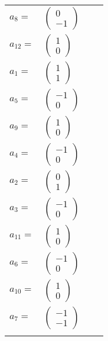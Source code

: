 \documentclass[1p]{elsarticle_modified}
\theoremstyle{definition}
\begin{document}
\begin{tabular}{m{7pt} m{180pt} m{7pt} m{180pt} }
\flushright $a_{8}=$&$\begin{pmatrix}0\\-1\end{pmatrix}$ \\
\flushright $a_{12}=$&$\begin{pmatrix}1\\0\end{pmatrix}$ \\
\flushright $a_{1}=$&$\begin{pmatrix}1\\1\end{pmatrix}$ \\
\flushright $a_{5}=$&$\begin{pmatrix}-1\\0\end{pmatrix}$ \\
\flushright $a_{9}=$&$\begin{pmatrix}1\\0\end{pmatrix}$ \\
\flushright $a_{4}=$&$\begin{pmatrix}-1\\0\end{pmatrix}$ \\
\flushright $a_{2}=$&$\begin{pmatrix}0\\1\end{pmatrix}$ \\
\flushright $a_{3}=$&$\begin{pmatrix}-1\\0\end{pmatrix}$ \\
\flushright $a_{11}=$&$\begin{pmatrix}1\\0\end{pmatrix}$ \\
\flushright $a_{6}=$&$\begin{pmatrix}-1\\0\end{pmatrix}$ \\
\flushright $a_{10}=$&$\begin{pmatrix}1\\0\end{pmatrix}$ \\
\flushright $a_{7}=$&$\begin{pmatrix}-1\\-1\end{pmatrix}$\\&\end{tabular}
\end{document}
